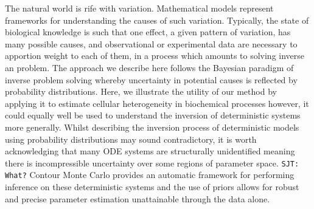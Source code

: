 The natural world is rife with variation. Mathematical models represent frameworks for understanding the causes of such variation. Typically, the state of biological knowledge is such that one effect, a given pattern of variation, has many possible causes, and observational or experimental data are necessary to apportion weight to each of them, in a process which amounts to solving inverse an problem. The approach we describe here follows the Bayesian paradigm of inverse problem solving whereby uncertainty in potential causes is reflected by probability distributions. Here, we illustrate the utility of our method by applying it to estimate cellular heterogeneity in biochemical processes however, it could equally well be used to understand the inversion of deterministic systems more generally. Whilst describing the inversion process of deterministic models using probability distributions may sound contradictory, it is worth acknowledging that many ODE systems are structurally unidentified meaning there is incompressible uncertainty over some regions of parameter space. {\tt SJT: What?} Contour Monte Carlo provides an automatic framework for performing inference on these deterministic systems and the use of priors allows for robust and precise parameter estimation unattainable through the data alone.

